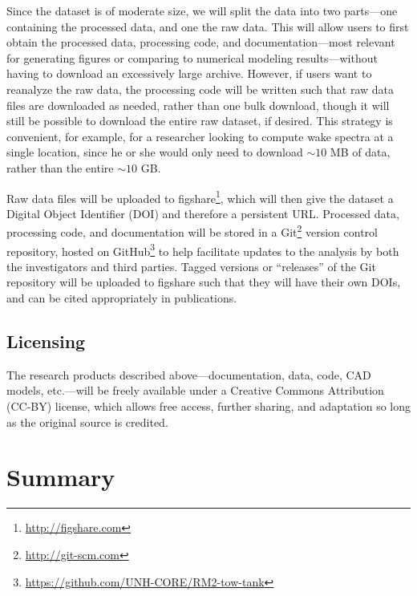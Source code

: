\documentclass[12pt,letterpaper]{scrreprt}
\begin{document}
Since the dataset is of moderate size, we will split the data into two
parts---one containing the processed data, and one the raw data. This will allow
users to first obtain the processed data, processing code, and
documentation---most relevant for generating figures or comparing to numerical
modeling results---without having to download an excessively large archive.
However, if users want to reanalyze the raw data, the processing code will be
written such that raw data files are downloaded as needed, rather than one bulk
download, though it will still be possible to download the entire raw dataset,
if desired. This strategy is convenient, for example, for a researcher looking
to compute wake spectra at a single location, since he or she would only need to
download $\sim 10$ MB of data, rather than the entire $\sim 10$ GB.

Raw data files will be uploaded to figshare\footnote{\url{http://figshare.com}},
which will then give the dataset a Digital Object Identifier (DOI) and therefore
a persistent URL. Processed data, processing code, and documentation will be
stored in a Git\footnote{\url{http://git-scm.com}} version control repository,
hosted on GitHub\footnote{\url{https://github.com/UNH-CORE/RM2-tow-tank}} to
help facilitate updates to the analysis by both the investigators and third
parties. Tagged versions or ``releases'' of the Git repository will be uploaded
to figshare such that they will have their own DOIs, and can be cited
appropriately in publications.

\section{Licensing} 

The research products described above---documentation, data, code, CAD models,
etc.---will be freely available under a Creative Commons Attribution (CC-BY)
license, which allows free access, further sharing, and adaptation so long as
the original source is credited.


\chapter{Summary}
\end{document}

